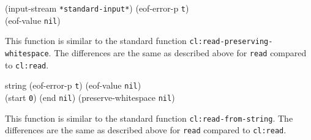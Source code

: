  {\optional (input-stream \texttt{*standard-input*})
  (eof-error-p \texttt{t})\\
  (eof-value \texttt{nil})}

This function is similar to the standard \commonlisp{} function
\texttt{cl:read-preserving-whitespace}.  The differences are the same
as described above for \texttt{read} compared to \texttt{cl:read}.

 {string \optional
  (eof-error-p \texttt{t})
  (eof-value \texttt{nil})\\
  \key
  (start \texttt{0})
  (end \texttt{nil})
  (preserve-whitespace \texttt{nil})}

This function is similar to the standard \commonlisp{} function
\texttt{cl:read-from-string}.  The differences are the same as
described above for \texttt{read} compared to \texttt{cl:read}.
